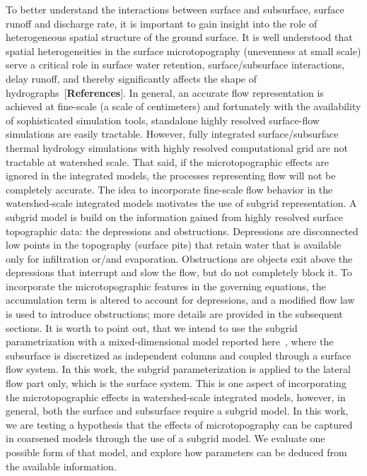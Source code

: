 \documentclass[review,11pt]{elsarticle}
\begin{document}
To better understand the interactions between surface and subsurface, surface runoff and discharge rate, it is important to gain insight into the role of
heterogeneous spatial structure of the ground surface.
It is well understood that spatial heterogeneities in the surface microtopography (unevenness at small scale) serve a critical role in surface water retention, surface/subsurface interactions, delay runoff, and thereby significantly affects the shape of hydrographs~\cite{huang2009influences}[\textbf{References}]. In general, an accurate flow representation is achieved at fine-scale (a scale of centimeters) and fortunately with the availability of sophisticated simulation tools, standalone highly resolved surface-flow simulations are easily tractable. However, fully integrated surface/subsurface thermal hydrology simulations with highly resolved computational grid are not tractable at watershed scale. That said, if the microtopographic effects are ignored in the integrated models, the processes representing flow will not be completely accurate. The idea to incorporate fine-scale flow behavior in the watershed-scale integrated models motivates the use of subgrid representation. 
A subgrid model is build on the information gained from highly resolved surface topographic data: the depressions and obstructions. Depressions are disconnected low points in the topography (surface pits) that retain water that is available only for infiltration or/and evaporation. Obstructions are objects exit above the depressions that interrupt and slow the flow, but do not completely block it. To incorporate the microtopographic features in the governing equations, the accumulation term is altered to account for depressions, and a modified flow law is used to introduce obstructions; more details are provided in the subsequent sections. 
It is worth to point out, that we intend to use the subgrid parametrization with a mixed-dimensional model reported here~\cite{jan2017}, where the subsurface is discretized as independent columns and coupled through a surface flow system. In this work, the subgrid parameterization is applied to the lateral flow part only, which is the surface system. This is one aspect of incorporating the microtopographic effects in watershed-scale integrated models, however, in general, both the surface and subsurface require a subgrid model. 
In this work, we are testing a hypothesis that the effects of microtopography can be captured in coarsened models through the use of a subgrid model. We evaluate one possible form of that model, and explore how parameters can be deduced from the available information.
\end{document}

